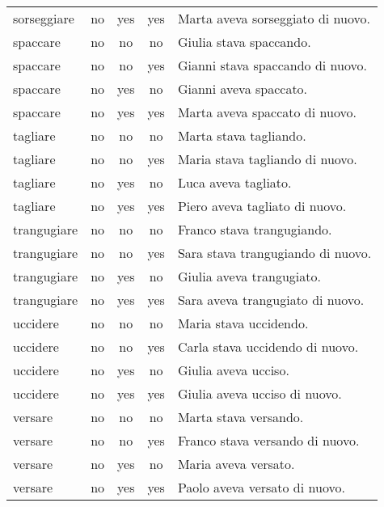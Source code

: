 \begin{longtable}{l|ccc|p{5cm}}
sorseggiare    & no   & yes        & yes       & Marta aveva sorseggiato di nuovo.     \\
spaccare       & no   & no         & no        & Giulia stava spaccando.               \\
spaccare       & no   & no         & yes       & Gianni stava spaccando di nuovo.      \\
spaccare       & no   & yes        & no        & Gianni aveva spaccato.                \\
spaccare       & no   & yes        & yes       & Marta aveva spaccato di nuovo.        \\
tagliare       & no   & no         & no        & Marta stava tagliando.                \\
tagliare       & no   & no         & yes       & Maria stava tagliando di nuovo.       \\
tagliare       & no   & yes        & no        & Luca aveva tagliato.                  \\
tagliare       & no   & yes        & yes       & Piero aveva tagliato di nuovo.        \\
trangugiare    & no   & no         & no        & Franco stava trangugiando.            \\
trangugiare    & no   & no         & yes       & Sara stava trangugiando di nuovo.     \\
trangugiare    & no   & yes        & no        & Giulia aveva trangugiato.             \\
trangugiare    & no   & yes        & yes       & Sara aveva trangugiato di nuovo.      \\
uccidere       & no   & no         & no        & Maria stava uccidendo.                \\
uccidere       & no   & no         & yes       & Carla stava uccidendo di nuovo.       \\
uccidere       & no   & yes        & no        & Giulia aveva ucciso.                  \\
uccidere       & no   & yes        & yes       & Giulia aveva ucciso di nuovo.         \\
versare        & no   & no         & no        & Marta stava versando.                 \\
versare        & no   & no         & yes       & Franco stava versando di nuovo.       \\
versare        & no   & yes        & no        & Maria aveva versato.                  \\
versare        & no   & yes        & yes       & Paolo aveva versato di nuovo.      
\end{longtable}

